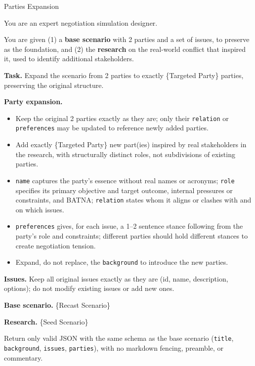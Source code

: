 \documentclass{llmxive}
\begin{document}
\begin{table}[p]
\centering
\begin{promptbox}{Parties Expansion}
\begin{userbox}
\scriptsize
You are an expert negotiation simulation designer.

\smallskip
You are given (1) a \textbf{base scenario} with 2 parties and a set of issues, to preserve as the foundation, and (2) the \textbf{research} on the real-world conflict that inspired it, used to identify additional stakeholders.

\smallskip
\textbf{Task.} Expand the scenario from 2 parties to exactly \{Targeted Party\} parties, preserving the original structure.

\smallskip
\textbf{Party expansion.}
\begin{itemize}[leftmargin=*, noitemsep, topsep=2pt]
\item Keep the original 2 parties exactly as they are; only their \texttt{relation} or \texttt{preferences} may be updated to reference newly added parties.
\item Add exactly \{Targeted Party\} new part(ies) inspired by real stakeholders in the research, with structurally distinct roles, not subdivisions of existing parties.
\item \texttt{name} captures the party's essence without real names or acronyms; \texttt{role} specifies its primary objective and target outcome, internal pressures or constraints, and BATNA; \texttt{relation} states whom it aligns or clashes with and on which issues.
\item \texttt{preferences} gives, for each issue, a 1--2 sentence stance following from the party's role and constraints; different parties should hold different stances to create negotiation tension.
\item Expand, do not replace, the \texttt{background} to introduce the new parties.
\end{itemize}

\smallskip
\textbf{Issues.} Keep all original issues exactly as they are (id, name, description, options); do not modify existing issues or add new ones.

\smallskip
\textbf{Base scenario.} \{Recast Scenario\}

\smallskip
\textbf{Research.} \{Seed Scenario\}

\smallskip
Return only valid JSON with the same schema as the base scenario (\texttt{title}, \texttt{background}, \texttt{issues}, \texttt{parties}), with no markdown fencing, preamble, or commentary.
\end{userbox}
\end{promptbox}
\vspace{-0.25cm}
\vspace{-0.3cm}
\label{tab:prompt-parties-exp}
\caption{Prompt for party-axis expansion.}
\end{table}
\end{document}
